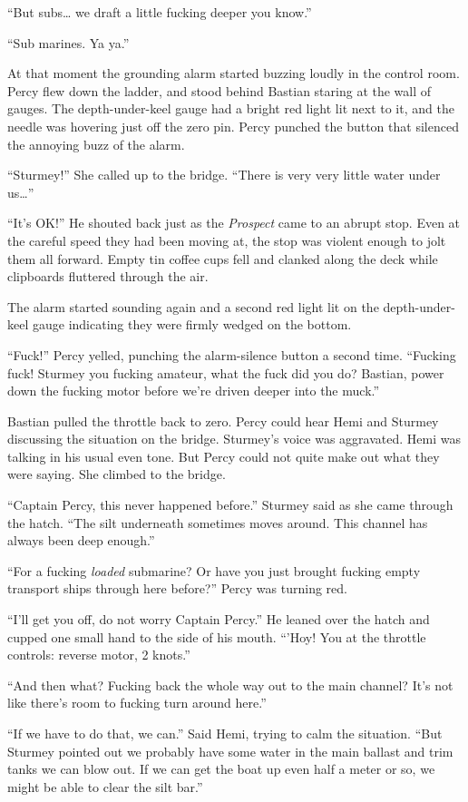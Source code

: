 \documentclass[
]{scrbook}
\begin{document}
``But subs\ldots{} we draft a little fucking deeper you know.''

``Sub marines. Ya ya.''

At that moment the grounding alarm started buzzing loudly in the control
room. Percy flew down the ladder, and stood behind Bastian staring at
the wall of gauges. The depth-under-keel gauge had a bright red light
lit next to it, and the needle was hovering just off the zero pin. Percy
punched the button that silenced the annoying buzz of the alarm.

``Sturmey!'' She called up to the bridge. ``There is very very little
water under us\ldots{}''

``It's OK!'' He shouted back just as the \emph{Prospect} came to an
abrupt stop. Even at the careful speed they had been moving at, the stop
was violent enough to jolt them all forward. Empty tin coffee cups fell
and clanked along the deck while clipboards fluttered through the air.

The alarm started sounding again and a second red light lit on the
depth-under-keel gauge indicating they were firmly wedged on the bottom.

``Fuck!'' Percy yelled, punching the alarm-silence button a second time.
``Fucking fuck! Sturmey you fucking amateur, what the fuck did you do?
Bastian, power down the fucking motor before we're driven deeper into
the muck.''

Bastian pulled the throttle back to zero. Percy could hear Hemi and
Sturmey discussing the situation on the bridge. Sturmey's voice was
aggravated. Hemi was talking in his usual even tone. But Percy could not
quite make out what they were saying. She climbed to the bridge.

``Captain Percy, this never happened before.'' Sturmey said as she came
through the hatch. ``The silt underneath sometimes moves around. This
channel has always been deep enough.''

``For a fucking \emph{loaded} submarine? Or have you just brought
fucking empty transport ships through here before?'' Percy was turning
red.

``I'll get you off, do not worry Captain Percy.'' He leaned over the
hatch and cupped one small hand to the side of his mouth. ``'Hoy! You at
the throttle controls: reverse motor, 2 knots.''

``And then what? Fucking back the whole way out to the main channel?
It's not like there's room to fucking turn around here.''

``If we have to do that, we can.'' Said Hemi, trying to calm the
situation. ``But Sturmey pointed out we probably have some water in the
main ballast and trim tanks we can blow out. If we can get the boat up
even half a meter or so, we might be able to clear the silt bar.''
\end{document}
